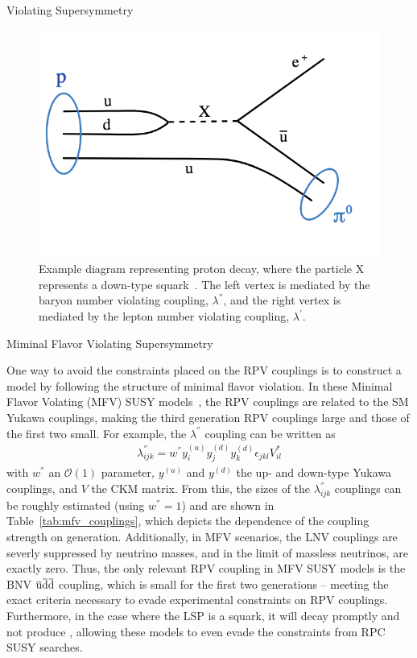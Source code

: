 \begin{section}{\RP Violating Supersymmetry}
\begin{figure}[tbp!]
\begin{center}
\includegraphics[angle=0,width=0.60\columnwidth]{fig/proton_decay.png}
\end{center}
\caption{Example diagram representing proton decay, where the particle X represents a down-type squark~\cite{Allanach:2016yth}.
The left vertex is mediated by the baryon number violating coupling, $\lambda^{''}$, and the right vertex is mediated by the lepton number violating coupling, $\lambda^{'}$.}
\label{fig:proton_decay}
\end{figure}

\begin{subsection}{Miminal Flavor Violating Supersymmetry}

One way to avoid the constraints placed on the RPV couplings is to construct a model by following the structure of minimal flavor violation.
In these Minimal Flavor Volating (MFV) SUSY models~\cite{Csaki:2013we,Krnjaic:2012aj,Csaki:2011ge}, the RPV couplings are related to the SM Yukawa couplings, making the third generation RPV couplings large and those of the first two small.
For example, the $\lambda^{''}$ coupling can be written as
\begin{align}
\lambda^{''}_{ijk} = w^{''} y^{(u)}_i y^{(d)}_j y^{(d)}_k \epsilon_{jkl} V^{*}_{il}
\end{align}
with $w^{''}$ an $\mathcal{O}(1)$ parameter, $y^{(u)}$ and $y^{(d)}$ the up- and down-type Yukawa couplings, and $V$ the CKM matrix.
From this, the sizes of the $\lambda^{''}_{ijk}$ couplings can be roughly estimated (using $w^{''} = 1$) and are shown in Table~\ref{tab:mfv_couplings}, which depicts the dependence of the coupling strength on generation.
Additionally, in MFV scenarios, the LNV couplings are severly suppressed by neutrino masses, and in the limit of massless neutrinos, are exactly zero.
Thus, the only relevant RPV coupling in MFV SUSY models is the BNV $\mkern1mu\overline{\mkern-1mu\mathrm{u}\mkern-1mu}\mkern1mu\mkern1mu\overline{\mkern-1mu\mathrm{d}\mkern-1mu}\mkern1mu\mkern1mu\overline{\mkern-1mu\mathrm{d}\mkern-1mu}\mkern1mu$ coupling, which is small for the first two generations -- meeting the exact criteria necessary to evade experimental constraints on RPV couplings.
Furthermore, in the case where the LSP is a squark, it will decay promptly and not produce \MET, allowing these models to even evade the constraints from RPC SUSY searches.


\end{subsection}
\end{section}
